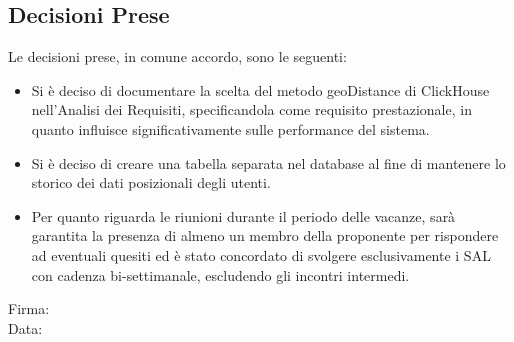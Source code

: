 \documentclass[10pt]{article}
\begin{document}
\subsection{Decisioni Prese}
Le decisioni prese, in comune accordo, sono le seguenti:
\begin{itemize}
    \item Si è deciso di documentare la scelta del metodo geoDistance di ClickHouse nell'Analisi dei Requisiti, specificandola come requisito prestazionale, in quanto influisce significativamente sulle performance del sistema.
    \item Si è deciso di creare una tabella separata nel database al fine di mantenere lo storico dei dati posizionali degli utenti.
    \item Per quanto riguarda le riunioni durante il periodo delle vacanze, sarà garantita la presenza di almeno un membro della proponente per rispondere ad eventuali quesiti ed è stato concordato di svolgere esclusivamente i SAL con cadenza bi-settimanale, escludendo gli incontri intermedi.
\end{itemize}


\vfill
\begin{minipage}{10cm}
Firma: \hrulefill \\
\vspace{2mm}
Data: \dotfill
\end{minipage}
\end{document}
